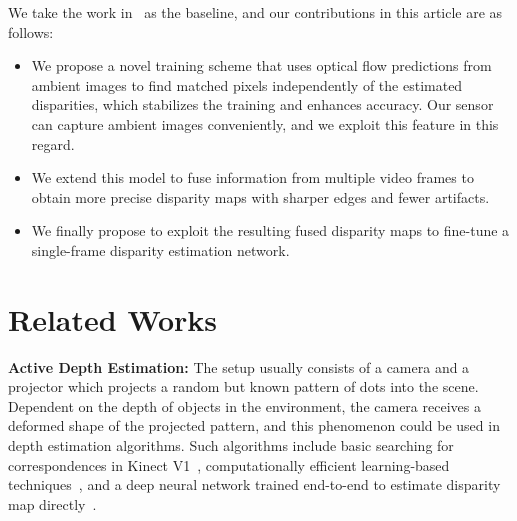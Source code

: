 We take the work in~\cite{riegler2019connecting} as the baseline, and our contributions in this article are as follows:
\begin{itemize}
\item We propose a novel training scheme that uses optical flow predictions from ambient images to find matched pixels independently of the estimated disparities, which stabilizes the training and enhances accuracy. Our sensor can capture ambient images conveniently, and we exploit this feature in this regard.
\item We extend this model to fuse information from multiple video frames to obtain more precise disparity maps with sharper edges and fewer artifacts.
\item We finally propose to exploit the resulting fused disparity maps to fine-tune a single-frame disparity estimation network.
\end{itemize}

\section{Related Works} \label{sec:c2_related_work}

\noindent\textbf{Active Depth Estimation:} The setup usually consists of a camera and a projector which projects a random but known pattern of dots into the scene. Dependent on the depth of objects in the environment, the camera receives a deformed shape of the projected pattern, and this phenomenon could be used in depth estimation algorithms. Such algorithms include basic searching for correspondences in Kinect V1~\cite{martinez2013kinect}, computationally efficient learning-based techniques~\cite{fanello2017ultrastereo, ryan2016hyperdepth, chen2014fast}, and a deep neural network trained end-to-end to estimate disparity map directly~\cite{zhang2018activestereonet, kleitsiotis2019color, riegler2019connecting}.

